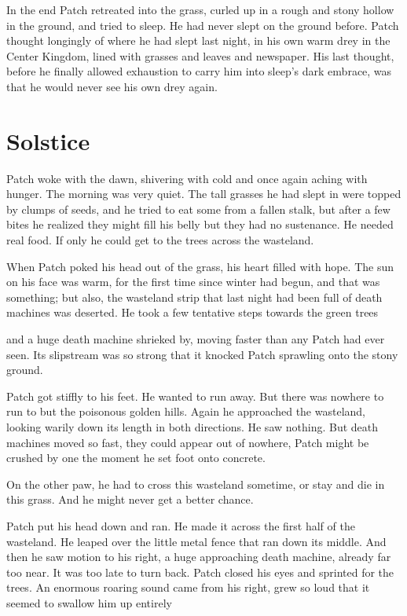 \documentclass[12pt]{book}
\begin{document}
 In the end Patch retreated into the grass, curled up in a rough and stony hollow in the ground, and tried to sleep. He had never slept on the ground before. Patch thought longingly of where he had slept last night, in his own warm drey in the Center Kingdom, lined with grasses and leaves and newspaper. His last thought, before he finally allowed exhaustion to carry him into sleep's dark embrace, was that he would never see his own drey again.\par

\section{Solstice}

 Patch woke with the dawn, shivering with cold and once again aching with hunger. The morning was very quiet. The tall grasses he had slept in were topped by clumps of seeds, and he tried to eat some from a fallen stalk, but after a few bites he realized they might fill his belly but they had no sustenance. He needed real food. If only he could get to the trees across the wasteland.\par
 When Patch poked his head out of the grass, his heart filled with hope. The sun on his face was warm, for the first time since winter had begun, and that was something; but also, the wasteland strip that last night had been full of death machines was deserted. He took a few tentative steps towards the green trees %
\par
 and a huge death machine shrieked by, moving faster than any Patch had ever seen. Its slipstream was so strong that it knocked Patch sprawling onto the stony ground.\par
 Patch got stiffly to his feet. He wanted to run away. But there was nowhere to run to but the poisonous golden hills. Again he approached the wasteland, looking warily down its length in both directions. He saw nothing. But death machines moved so fast, they could appear out of nowhere, Patch might be crushed by one the moment he set foot onto concrete.\par
On the other paw, he had to cross this wasteland sometime, or stay and die in this grass. And he might never get a better chance.\par
Patch put his head down and ran. He made it across the first half of the wasteland. He leaped over the little metal fence that ran down its middle. And then he saw motion to his right, a huge approaching death machine, already far too near. It was too late to turn back. Patch closed his eyes and sprinted for the trees. An enormous roaring sound came from his right, grew so loud that it seemed to swallow him up entirely %
\end{document}
